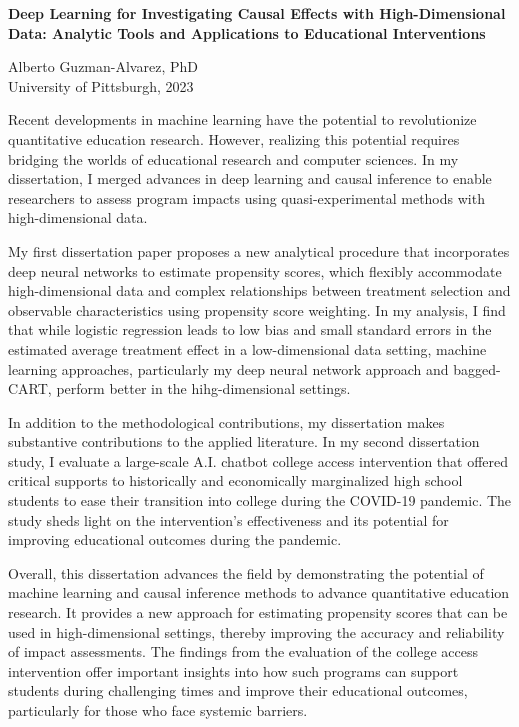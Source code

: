 \pagestyle{plain}

\begin{center}
   \begin{singlespace}
        \textbf{Deep Learning for Investigating Causal Effects with High-Dimensional Data: Analytic Tools and Applications to Educational Interventions}
   \end{singlespace}
   
   \vspace{1\baselineskip}
   
        Alberto Guzman-Alvarez, PhD\\
        University of Pittsburgh, 2023\\
\end{center}
\vspace*{1\baselineskip}


Recent developments in machine learning have the potential to revolutionize quantitative education research. However, realizing this potential requires bridging the worlds of educational research and computer sciences. In my dissertation, I merged advances in deep learning and causal inference to enable researchers to assess program impacts using quasi-experimental methods with high-dimensional data.

My first dissertation paper proposes a new analytical procedure that incorporates deep neural networks to estimate propensity scores, which flexibly accommodate high-dimensional data and complex relationships between treatment selection and observable characteristics using propensity score weighting. In my analysis, I find that while logistic regression leads to low bias and small standard errors in the estimated average treatment effect in a low-dimensional data setting, machine learning approaches, particularly my deep neural network approach and bagged-CART, perform better in the hihg-dimensional settings.

In addition to the methodological contributions, my dissertation makes substantive contributions to the applied literature. In my second dissertation study, I evaluate a large-scale A.I. chatbot college access intervention that offered critical supports to historically and economically marginalized high school students to ease their transition into college during the COVID-19 pandemic. The study sheds light on the intervention's effectiveness and its potential for improving educational outcomes during the pandemic.

Overall, this dissertation advances the field by demonstrating the potential of machine learning and causal inference methods to advance quantitative education research. It provides a new approach for estimating propensity scores that can be used in high-dimensional settings, thereby improving the accuracy and reliability of impact assessments. The findings from the evaluation of the college access intervention offer important insights into how such programs can support students during challenging times and improve their educational outcomes, particularly for those who face systemic barriers.

\newpage